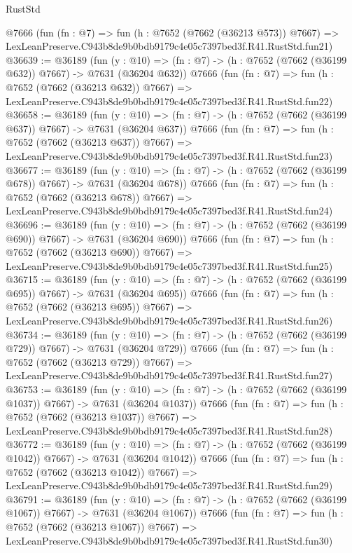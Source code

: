 \begin{lexlean}{RustStd}
\begin{coremodule}
    @7666
    (fun (fn : @7) =>
    fun (h : @7652 (@7662 (@36213 @573)) @7667) =>
    LexLeanPreserve.C943b8de9b0bdb9179c4e05c7397bed3f.R41.RustStd.fun21)
@36639 := @36189
    (fun (y : @10) => (fn : @7) -> (h : @7652 (@7662 (@36199 @632)) @7667) -> @7631 (@36204 @632))
    @7666
    (fun (fn : @7) =>
    fun (h : @7652 (@7662 (@36213 @632)) @7667) =>
    LexLeanPreserve.C943b8de9b0bdb9179c4e05c7397bed3f.R41.RustStd.fun22)
@36658 := @36189
    (fun (y : @10) => (fn : @7) -> (h : @7652 (@7662 (@36199 @637)) @7667) -> @7631 (@36204 @637))
    @7666
    (fun (fn : @7) =>
    fun (h : @7652 (@7662 (@36213 @637)) @7667) =>
    LexLeanPreserve.C943b8de9b0bdb9179c4e05c7397bed3f.R41.RustStd.fun23)
@36677 := @36189
    (fun (y : @10) => (fn : @7) -> (h : @7652 (@7662 (@36199 @678)) @7667) -> @7631 (@36204 @678))
    @7666
    (fun (fn : @7) =>
    fun (h : @7652 (@7662 (@36213 @678)) @7667) =>
    LexLeanPreserve.C943b8de9b0bdb9179c4e05c7397bed3f.R41.RustStd.fun24)
@36696 := @36189
    (fun (y : @10) => (fn : @7) -> (h : @7652 (@7662 (@36199 @690)) @7667) -> @7631 (@36204 @690))
    @7666
    (fun (fn : @7) =>
    fun (h : @7652 (@7662 (@36213 @690)) @7667) =>
    LexLeanPreserve.C943b8de9b0bdb9179c4e05c7397bed3f.R41.RustStd.fun25)
@36715 := @36189
    (fun (y : @10) => (fn : @7) -> (h : @7652 (@7662 (@36199 @695)) @7667) -> @7631 (@36204 @695))
    @7666
    (fun (fn : @7) =>
    fun (h : @7652 (@7662 (@36213 @695)) @7667) =>
    LexLeanPreserve.C943b8de9b0bdb9179c4e05c7397bed3f.R41.RustStd.fun26)
@36734 := @36189
    (fun (y : @10) => (fn : @7) -> (h : @7652 (@7662 (@36199 @729)) @7667) -> @7631 (@36204 @729))
    @7666
    (fun (fn : @7) =>
    fun (h : @7652 (@7662 (@36213 @729)) @7667) =>
    LexLeanPreserve.C943b8de9b0bdb9179c4e05c7397bed3f.R41.RustStd.fun27)
@36753 := @36189
    (fun (y : @10) => (fn : @7) -> (h : @7652 (@7662 (@36199 @1037)) @7667) -> @7631 (@36204 @1037))
    @7666
    (fun (fn : @7) =>
    fun (h : @7652 (@7662 (@36213 @1037)) @7667) =>
    LexLeanPreserve.C943b8de9b0bdb9179c4e05c7397bed3f.R41.RustStd.fun28)
@36772 := @36189
    (fun (y : @10) => (fn : @7) -> (h : @7652 (@7662 (@36199 @1042)) @7667) -> @7631 (@36204 @1042))
    @7666
    (fun (fn : @7) =>
    fun (h : @7652 (@7662 (@36213 @1042)) @7667) =>
    LexLeanPreserve.C943b8de9b0bdb9179c4e05c7397bed3f.R41.RustStd.fun29)
@36791 := @36189
    (fun (y : @10) => (fn : @7) -> (h : @7652 (@7662 (@36199 @1067)) @7667) -> @7631 (@36204 @1067))
    @7666
    (fun (fn : @7) =>
    fun (h : @7652 (@7662 (@36213 @1067)) @7667) =>
    LexLeanPreserve.C943b8de9b0bdb9179c4e05c7397bed3f.R41.RustStd.fun30)

\end{coremodule}
\end{lexlean}
